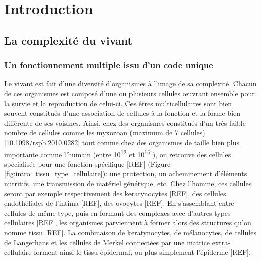 \setcounter{chapter}{1}         %
\setcounter{section}{0}
\chapter*{Introduction}         %
\label{chapter:intro}
\graphicspath{ {./img/intro} }





\section{La complexité du vivant}

\subsection{Un fonctionnement multiple issu d'un code unique}

Le vivant est fait d'une diversité d'organismes à l'image de sa complexité. Chacun de ces organismes est composé d'une ou plusieurs cellules œuvrant ensemble pour la survie et la reproduction de celui-ci. Ces êtres multicellulaires sont bien souvent constitués d’une association de cellules à la fonction et la forme bien différente de ses voisines. Ainsi, chez des organismes constitués d'un très faible nombre de cellules comme les myxozoan (maximum de 7 cellules) [10.1098/rspb.2010.0282] tout comme chez des organismes de taille bien plus importante comme l'humain (entre 10\textsuperscript{12} et 10\textsuperscript{16} \cite{Bianconi2013}), on retrouve des cellules spécialisée pour une fonction spécifique [REF] (Figure \ref{fig:intro_tissu_type_cellulaire}): une protection, un acheminement d'éléments nutritifs, une transmission de matériel génétique, etc. Chez l’homme, ces cellules seront par exemple respectivement des keratynocytes [REF], des cellules endothéliales de l’intima [REF], des ovocytes [REF]. En s’assemblant entre cellules de même type, puis en formant des complexes avec d’autres types cellulaires [REF], les organismes parviennent à former alors des structures qu’on nomme tissu [REF]. La combinaison de keratynocytes, de mélanocytes, de cellules de Langerhans et les cellules de Merkel connectées par une matrice extra-cellulaire forment ainsi le tissu épidermal, ou plus simplement l’épiderme [REF].

